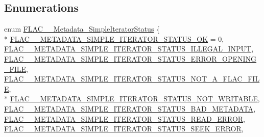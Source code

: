 \subsection*{Enumerations}
\begin{DoxyCompactItemize}
\item 
enum \hyperlink{group__flac__metadata__level1_gac926e7d2773a05066115cac9048bbec9}{F\+L\+A\+C\+\_\+\+\_\+\+Metadata\+\_\+\+Simple\+Iterator\+Status} \{ \\*
\hyperlink{group__flac__metadata__level1_ggac926e7d2773a05066115cac9048bbec9a33aadd73194c0d7e307d643237e0ddcd}{F\+L\+A\+C\+\_\+\+\_\+\+M\+E\+T\+A\+D\+A\+T\+A\+\_\+\+S\+I\+M\+P\+L\+E\+\_\+\+I\+T\+E\+R\+A\+T\+O\+R\+\_\+\+S\+T\+A\+T\+U\+S\+\_\+\+OK} = 0, 
\hyperlink{group__flac__metadata__level1_ggac926e7d2773a05066115cac9048bbec9a0a3933cb38c8957a8d5c3d1afb4766f9}{F\+L\+A\+C\+\_\+\+\_\+\+M\+E\+T\+A\+D\+A\+T\+A\+\_\+\+S\+I\+M\+P\+L\+E\+\_\+\+I\+T\+E\+R\+A\+T\+O\+R\+\_\+\+S\+T\+A\+T\+U\+S\+\_\+\+I\+L\+L\+E\+G\+A\+L\+\_\+\+I\+N\+P\+UT}, 
\hyperlink{group__flac__metadata__level1_ggac926e7d2773a05066115cac9048bbec9a20e835bbb74b4d039e598617f68d2af6}{F\+L\+A\+C\+\_\+\+\_\+\+M\+E\+T\+A\+D\+A\+T\+A\+\_\+\+S\+I\+M\+P\+L\+E\+\_\+\+I\+T\+E\+R\+A\+T\+O\+R\+\_\+\+S\+T\+A\+T\+U\+S\+\_\+\+E\+R\+R\+O\+R\+\_\+\+O\+P\+E\+N\+I\+N\+G\+\_\+\+F\+I\+LE}, 
\hyperlink{group__flac__metadata__level1_ggac926e7d2773a05066115cac9048bbec9a7785f77a612be8956fbe7cab73497220}{F\+L\+A\+C\+\_\+\+\_\+\+M\+E\+T\+A\+D\+A\+T\+A\+\_\+\+S\+I\+M\+P\+L\+E\+\_\+\+I\+T\+E\+R\+A\+T\+O\+R\+\_\+\+S\+T\+A\+T\+U\+S\+\_\+\+N\+O\+T\+\_\+\+A\+\_\+\+F\+L\+A\+C\+\_\+\+F\+I\+LE}, 
\\*
\hyperlink{group__flac__metadata__level1_ggac926e7d2773a05066115cac9048bbec9af055d8c0c663e72134fe2db8037b6880}{F\+L\+A\+C\+\_\+\+\_\+\+M\+E\+T\+A\+D\+A\+T\+A\+\_\+\+S\+I\+M\+P\+L\+E\+\_\+\+I\+T\+E\+R\+A\+T\+O\+R\+\_\+\+S\+T\+A\+T\+U\+S\+\_\+\+N\+O\+T\+\_\+\+W\+R\+I\+T\+A\+B\+LE}, 
\hyperlink{group__flac__metadata__level1_ggac926e7d2773a05066115cac9048bbec9a14c897124887858109200723826f85b7}{F\+L\+A\+C\+\_\+\+\_\+\+M\+E\+T\+A\+D\+A\+T\+A\+\_\+\+S\+I\+M\+P\+L\+E\+\_\+\+I\+T\+E\+R\+A\+T\+O\+R\+\_\+\+S\+T\+A\+T\+U\+S\+\_\+\+B\+A\+D\+\_\+\+M\+E\+T\+A\+D\+A\+TA}, 
\hyperlink{group__flac__metadata__level1_ggac926e7d2773a05066115cac9048bbec9a088df964f0852dd7e19304e920c3ee8e}{F\+L\+A\+C\+\_\+\+\_\+\+M\+E\+T\+A\+D\+A\+T\+A\+\_\+\+S\+I\+M\+P\+L\+E\+\_\+\+I\+T\+E\+R\+A\+T\+O\+R\+\_\+\+S\+T\+A\+T\+U\+S\+\_\+\+R\+E\+A\+D\+\_\+\+E\+R\+R\+OR}, 
\hyperlink{group__flac__metadata__level1_ggac926e7d2773a05066115cac9048bbec9a2ad85a32e291d1e918692d68cc22fd40}{F\+L\+A\+C\+\_\+\+\_\+\+M\+E\+T\+A\+D\+A\+T\+A\+\_\+\+S\+I\+M\+P\+L\+E\+\_\+\+I\+T\+E\+R\+A\+T\+O\+R\+\_\+\+S\+T\+A\+T\+U\+S\+\_\+\+S\+E\+E\+K\+\_\+\+E\+R\+R\+OR}, 

\end{DoxyCompactItemize}
